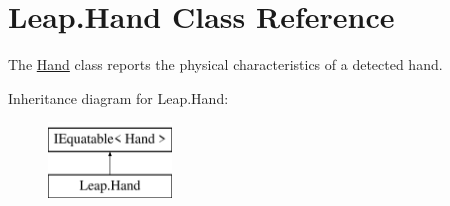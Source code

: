 \hypertarget{class_leap_1_1_hand}{}\section{Leap.\+Hand Class Reference}
\label{class_leap_1_1_hand}


The \mbox{\hyperlink{class_leap_1_1_hand}{Hand}} class reports the physical characteristics of a detected hand.  


Inheritance diagram for Leap.\+Hand\+:\begin{figure}[H]
\begin{center}
\leavevmode
\includegraphics[height=2.000000cm]{class_leap_1_1_hand}
\end{center}
\end{figure}
